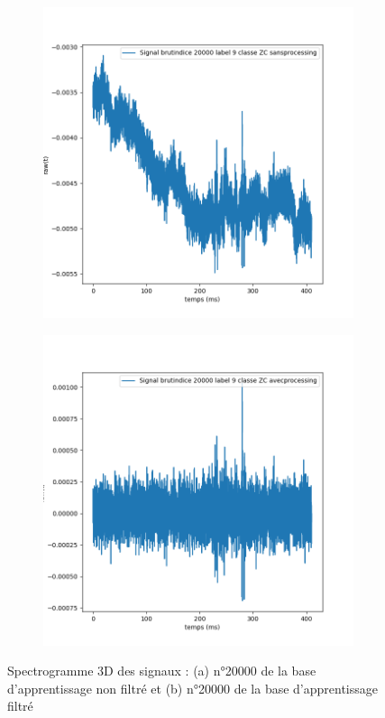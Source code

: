 \begin{figure}[!h]
\centering
  \begin{subfigure}[b]{0.45\textwidth}
    \includegraphics[width=\textwidth]{./images/indice20000Spectro1Dlabel9classeZCsansprocessingsanszoom.png}
    \caption{}
  \end{subfigure}
  \begin{subfigure}[b]{0.45\textwidth}
    \includegraphics[width=\textwidth]{./images/indice20000Spectro1Dlabel9classeZCavecprocessingsanszoom.png}
    \caption{}
  \end{subfigure}
  \caption{Spectrogramme 3D des signaux : (a) n°20000 de la base d'apprentissage non filtré et (b) n°20000 de la base d'apprentissage filtré%
\label{fig:20000zoomavecetsansfiltrage}}
\end{figure}


